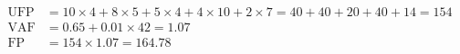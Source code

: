 \begin{formulas}
\begin{align*}
\text{UFP} &= 10\times4 + 8\times5 + 5\times4 + 4\times10 + 2\times7 = 40 + 40 + 20 + 40 + 14 = 154\\
\text{VAF} &= 0.65 + 0.01\times 42 = 1.07\\
\text{FP} &= 154 \times 1.07 = \mathbf{164.78}
\end{align*}
\end{formulas}
